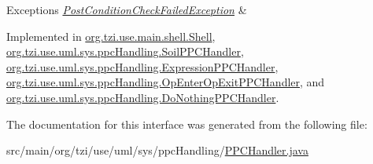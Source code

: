 \begin{DoxyExceptions}{Exceptions}
{\em \hyperlink{classorg_1_1tzi_1_1use_1_1uml_1_1sys_1_1ppc_handling_1_1_post_condition_check_failed_exception}{Post\-Condition\-Check\-Failed\-Exception}} & \\
\hline
\end{DoxyExceptions}


Implemented in \hyperlink{classorg_1_1tzi_1_1use_1_1main_1_1shell_1_1_shell_a49b5901588cc27d58da8ed45500e7c69}{org.\-tzi.\-use.\-main.\-shell.\-Shell}, \hyperlink{classorg_1_1tzi_1_1use_1_1uml_1_1sys_1_1ppc_handling_1_1_soil_p_p_c_handler_a75bbc34c615ea7c01b64c2b47cf7b25e}{org.\-tzi.\-use.\-uml.\-sys.\-ppc\-Handling.\-Soil\-P\-P\-C\-Handler}, \hyperlink{classorg_1_1tzi_1_1use_1_1uml_1_1sys_1_1ppc_handling_1_1_expression_p_p_c_handler_ab74ca661ff213373425778d3f38532b3}{org.\-tzi.\-use.\-uml.\-sys.\-ppc\-Handling.\-Expression\-P\-P\-C\-Handler}, \hyperlink{classorg_1_1tzi_1_1use_1_1uml_1_1sys_1_1ppc_handling_1_1_op_enter_op_exit_p_p_c_handler_a346b7d41477271d6dd554536f3833c30}{org.\-tzi.\-use.\-uml.\-sys.\-ppc\-Handling.\-Op\-Enter\-Op\-Exit\-P\-P\-C\-Handler}, and \hyperlink{classorg_1_1tzi_1_1use_1_1uml_1_1sys_1_1ppc_handling_1_1_do_nothing_p_p_c_handler_a0fdb9098cb054316d4df136615878ad5}{org.\-tzi.\-use.\-uml.\-sys.\-ppc\-Handling.\-Do\-Nothing\-P\-P\-C\-Handler}.



The documentation for this interface was generated from the following file\-:\begin{DoxyCompactItemize}
\item 
src/main/org/tzi/use/uml/sys/ppc\-Handling/\hyperlink{_p_p_c_handler_8java}{P\-P\-C\-Handler.\-java}\end{DoxyCompactItemize}
